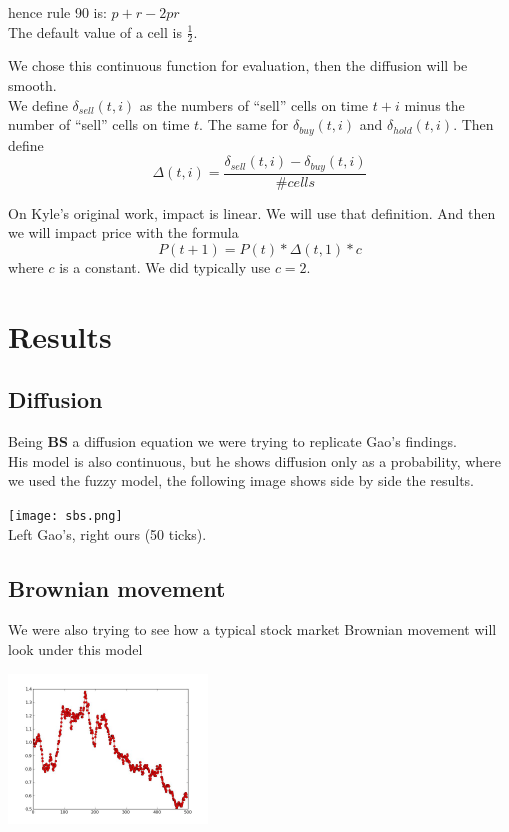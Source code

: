 \documentclass[twoside]{article}
\begin{document}
\begin{multicols}{2}
hence rule 90 is: $ p + r - 2pr$\\

The default value of a cell is $\frac{1}{2}$.

We chose this continuous function for evaluation, then the diffusion will be smooth.\\

We define $\delta_{sell}(t,i)$ as the numbers of ``sell'' cells on time $t+i$ minus the number of ``sell'' cells on time $t$. The same for $\delta_{buy}(t,i)$ and $\delta_{hold}(t,i)$. Then define $$\Delta(t,i) = \frac{\delta_{sell}(t,i)-\delta_{buy}(t,i)}{\#cells}$$

On Kyle's original work, impact is linear. We will use that definition. And then we will impact price with the formula $$P(t+1)=P(t)*\Delta(t,1)*c$$ where $c$ is a constant. We did typically use $c=2$.



\section{Results}

\subsection{Diffusion}
Being {\bf BS} a diffusion equation we were trying to replicate Gao's findings.\\
His model is also continuous, but he shows diffusion only as a probability, where we used the fuzzy model, the following image shows side by side the results.

\begin{center}
  \texttt{[image: sbs.png]}\\
  Left Gao's, right ours (50 ticks).
\end{center}


\subsection{Brownian movement}
We were also trying to see how a typical stock market Brownian movement will look under this model

\begin{center}
  \includegraphics[width=200px]{grafica4.jpg}\\
\end{center}


\end{multicols}
\end{document}

